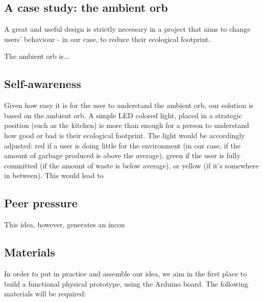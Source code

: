 \documentclass{sigchi-ext}
\begin{document}
\subsection{A case study: the ambient orb}
A great and useful design is strictly necessary in a project that aims to change users' behaviour - in our case, to reduce their ecological footprint.

The ambient orb is...

\subsection{Self-awareness}
Given how easy it is for the user to understand the ambient orb, our solution is based on the ambient orb. A simple LED colored light, placed in a strategic position (such as the kitchen) is more than enough for a person to understand how good or bad is their ecological footprint. The light would be accordingly adjusted: red if a user is doing little for the environment (in our case, if the amount of garbage produced is above the average), green if the user is fully committed (if the amount of waste is below average), or yellow (if it's somewhere in between). This would lead to 

\subsection{Peer pressure}
This idea, however, generates an incon

\subsection{Materials}
In order to put in practice and assemble our idea, we aim in the first place to build a functional physical prototype, using the Arduino board. The following materials will be required:
\end{document}
